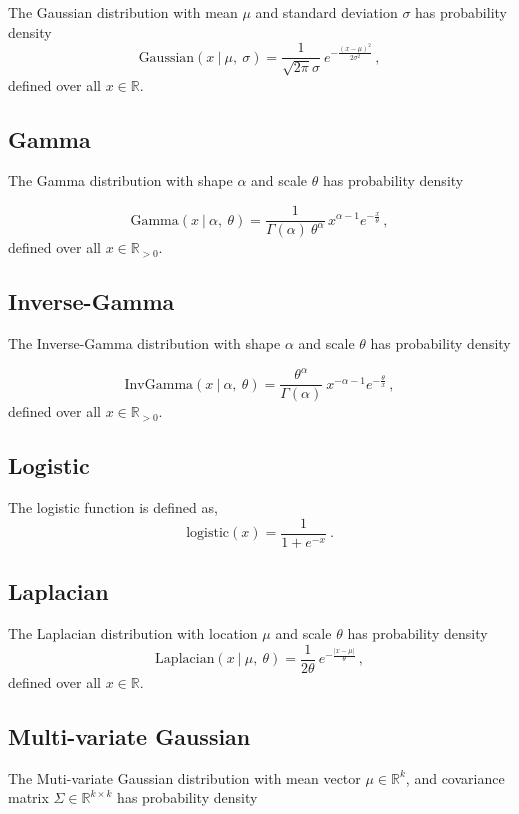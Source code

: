 \documentclass[12pt,letterpaper,onecolumn,oneside]{article}
\begin{document}
\begin{appendices}
The Gaussian distribution with mean $\mu$ and standard deviation
$\sigma$ has probability density
\[ \text{Gaussian}(x \ | \ \mu, \ \sigma) = \frac{1}{\sqrt{2\pi}\sigma}
\ 
e^{-\frac{(x - \mu)^2}{2\sigma^2}} \, ,\] 
defined over all $x \in \mathbb{R}$.

\subsection{Gamma}

The Gamma distribution with shape $\alpha$ and scale $\theta$ has probability
density 

\[\text{Gamma}(x \ | \ \alpha, \ \theta) = \frac{1}{\Gamma(\alpha) \ 
  \theta^\alpha} \,  x^{\alpha-1}  e^{-\frac{x}{\theta}} \, , \]
defined over all $x \in \mathbb{R}_{>0}$.

\subsection{Inverse-Gamma}

The Inverse-Gamma distribution with shape $\alpha$ and scale $\theta$
has probability density

\[\text{InvGamma}(x \ | \ \alpha, \ \theta) 
= \frac{\theta^\alpha}{\Gamma(\alpha)}
 \ x^{-\alpha-1} e^{-\frac{\theta}{x}} \, , \] defined over all $x \in
 \mathbb{R}_{>0}$.

\subsection{Logistic}

The logistic function is defined as,
\[ \text{logistic}(x) = \frac{1}{1 + e^{-x}} \ . \]

\subsection{Laplacian}

The Laplacian distribution with location $\mu$ and scale $\theta$ has
probability density
\[ \text{Laplacian}(x \ | \ \mu, \ \theta) = \frac{1}{2 \theta} \ 
e^{-\frac{|x - \mu|}{\theta}}
\, ,\]
defined over all $x \in \mathbb{R}$.


\subsection{Multi-variate Gaussian}

The Muti-variate Gaussian distribution with mean vector
$\mu \in \mathbb{R}^k$, and
covariance matrix $\Sigma  \in \mathbb{R}^{k \times k}$ has probability density


\end{appendices}
\end{document}
